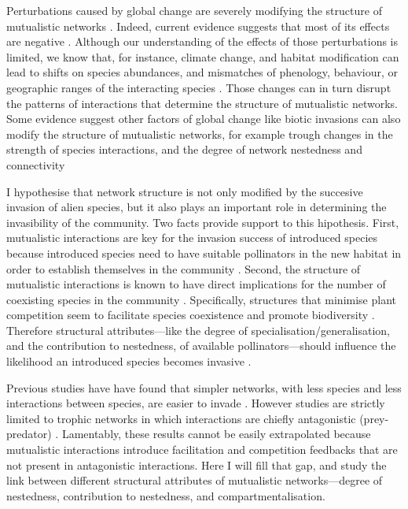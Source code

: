 \documentclass[a4paper]{article}
\begin{document}
Perturbations caused by global change are severely modifying the structure of mutualistic networks \citep{Burkle2013a}.
Indeed, current evidence suggests that most of its effects are negative \citep{Tylianakis2008, Tylianakis2010}.
Although our understanding of the effects of those perturbations is limited, we know that, for instance, climate change, and habitat modification can lead to shifts on species abundances, and mismatches of phenology, behaviour, or geographic ranges of the interacting species \citep{Memmott2007, Tylianakis2008, Hegland2009, Burkle2013a}.
Those changes can in turn disrupt the patterns of interactions that determine the structure of mutualistic networks.
Some evidence suggest other factors of global change like biotic invasions can also modify the structure of mutualistic networks, for example trough changes in the strength of species interactions, and the degree of network nestedness and connectivity \citep{Olesen2002, Aizen2008, Bartomeus2008, Vila2009, Traveset2013}

I hypothesise that network structure is not only modified by the succesive invasion of alien species, but it also plays an important role in determining the invasibility of the community.
Two facts provide support to this hipothesis.
First, mutualistic interactions are key for the invasion success of introduced species because introduced species need to have suitable pollinators in the new habitat in order to establish themselves in the community \citep{Richardson2000, Sargent2008}.
Second, the structure of mutualistic interactions is known to have direct implications for the number of coexisting species in the community \citep{Moeller2004, Bascompte2006, Bascompte2007, Bastolla2009}.
Specifically, structures that minimise plant competition seem to facilitate species coexistence and promote biodiversity \citep{Bastolla2009}.
Therefore structural attributes---like the degree of specialisation/generalisation, and the contribution to nestedness, of available pollinators---should influence the likelihood an introduced species becomes invasive \citep{Stouffer2014}.

Previous studies have have found that simpler networks, with less species and less interactions between species, are easier to invade \citep{Romanuk2009, Galiana2014}.
However studies are strictly limited to trophic networks in which interactions are chiefly antagonistic (prey-predator) \citep{Romanuk2009, Baiser2010, Galiana2014}.
Lamentably, these results cannot be easily extrapolated because mutualistic interactions introduce facilitation and competition feedbacks that are not present in antagonistic interactions.
Here I will fill that gap, and study the link between different structural attributes of mutualistic networks---degree of nestedness, contribution to nestedness, and compartmentalisation.
\end{document}
